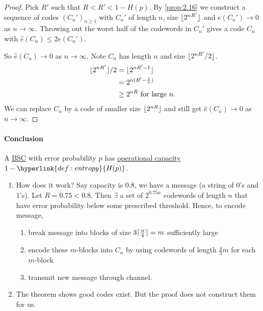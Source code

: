 \documentclass{article}
\DeclarePairedDelimiter{\floor}{\lfloor}{\rfloor}
\DeclarePairedDelimiter{\ceil}{\lceil}{\rceil}
\newcommand{\1}[1]{\mathbbm{1}_{#1}}
\begin{document}
\begin{proof}
    Pick $R'$ such that $R < R' < 1 - H(p)$.
    By \cref{prop:2.16} we construct a sequence of codes $(C_n')_{n \geq 1}$ with $C_n'$ of length $n$, size $\floor{2^{nR'}}$ and $e(C_n') \to 0$ as $n \to \infty$.
    Throwing out the worst half of the codewords in $C_n'$ gives a code $C_n$ with $\hat{e}(C_n) \leq 2 e(C_n')$.

    So $\hat{e}(C_n) \to 0$ as $n \to \infty$.
    Note $C_n$ has length $n$ and size $\floor{2^{nR'}/2}$.
    \begin{align*}
        \floor{2^{nR'}}/2 &= \floor{2^{nR'-1}} \\
                          &= 2^{n(R' - \frac{1}{n})} \\
                          &\geq 2^{nR} \text{ for large } n.
    \end{align*}
    We can replace $C_n$ by a code of smaller size $\floor{2^{nR}}$ and still get $\hat{e}(C_n) \to 0$ as $n \to \infty$.
\end{proof}

\paragraph{Conclusion} A \hyperlink{def:bsc}{BSC} with error probability $p$ has \hyperlink{def:capacity}{operational capacity} $1 - \hyperlink{def:entropy}{H(p)}$.

\begin{remark}\leavevmode
    \begin{enumerate}[label=(\roman*)]
        \item How does it work? Say capacity is $0.8$, we have a message (a string of $0$'s and $1$'s).
            Let $R = 0.75 < 0.8$.
            Then $\exists$ a set of $2^{0.75 n}$ codewords of length $n$ that have error probability below some prescribed threshold.
            Hence, to encode message,
            \begin{enumerate}[label=\alph*)]
                \item break message into blocks of size $3 \ceil{\frac{n}{4}} = m$ sufficiently large
                \item encode these $m$-blocks into $C_n$ by using codewords of length $\frac{4}{3} m$ for each $m$-block
                \item transmit new message through channel.
            \end{enumerate}
        \item The theorem shows good codes exist. But the proof does not construct them for us.
    \end{enumerate}
\end{remark}
\end{document}
